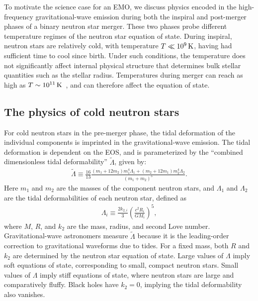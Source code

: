 \documentclass[prx,superscriptaddress,twocolumn,nopreprintnumbers,floatfix,nofootinbib]{revtex4}
\begin{document}
To motivate the science case for an EMO, we discuss physics encoded in the high-frequency gravitational-wave emission during both the inspiral and post-merger phases of a binary neutron star merger.
These two phases probe different temperature regimes of the neutron star equation of state.
During inspiral, neutron stars are relatively cold, with temperature $T\ll\unit[10^{9}]{K}$, having had sufficient time to cool since birth.  
Under such conditions, the temperature does not significantly affect internal physical structure that determines bulk stellar quantities such as the stellar radius.  
Temperatures during merger can reach as high as $T\sim\unit[10^{11}]{K}$~\cite[e.g.,][]{Baiotti2008,foucart16}, and can therefore affect the equation of state. 


\subsection{The physics of cold neutron stars}
For cold neutron stars in the pre-merger phase, the tidal deformation of the individual components is imprinted in the gravitational-wave emission.  The tidal deformation is dependent on the EOS, and is parameterized by the ``combined dimensionless tidal deformability'' $\tilde\Lambda$, given by:
\begin{align}
    \tilde\Lambda \equiv \frac{16}{13}\frac{(m_1+12m_2)m_1^4\Lambda_1+(m_2+12m_1)m_2^4\Lambda_2}{(m_1+m_2)^5}.
\end{align}
Here $m_1$ and $m_2$ are the masses of the component neutron stars, and $\Lambda_1$ and $\Lambda_2$ are the tidal deformabilities of each neutron star, defined as
\begin{align}
    \Lambda_i\equiv\frac{2k_{2,i}}{3}\left(\frac{c^2R_i}{GM_i}\right)^5,
\end{align}
where $M$, $R$, and $k_{2}$ are the mass, radius, and second Love number.
Gravitational-wave astronomers measure $\tilde\Lambda$ because it is the leading-order correction to gravitational waveforms due to tides.
For a fixed mass, both $R$ and $k_2$ are determined by the neutron star equation of state.
Large values of $\Lambda$ imply soft equations of state, corresponding to small, compact neutron stars.  Small values of $\Lambda$ imply stiff equations of state, where neutron stars are large and comparatively fluffy.
Black holes have $k_2=0$, implying the tidal deformability also vanishes.
\end{document}
